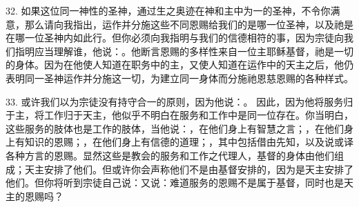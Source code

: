 32. 如果这位同一神性的圣神，通过生之奥迹在神和主中为一的圣神，不令你满意，那么请向我指出，运作并分施这些不同恩赐给我们的是哪一位圣神，以及祂是在哪一位圣神内如此行。但你必须向我指明与我们的信德相符的事，因为宗徒向我们指明应当理解谁，他说：。他断言恩赐的多样性来自一位主耶稣基督，祂是一切的身体。因为在他使人知道在职务中的主，又使人知道在运作中的天主之后，他仍表明同一圣神运作并分施这一切，为建立同一身体而分施祂恩慈恩赐的各种样式。\par

33. 或许我们以为宗徒没有持守合一的原则，因为他说：。 因此，因为他将服务归于主，将工作归于天主，他似乎不明白在服务和工作中是同一位存在。你当明白，这些服务的肢体也是工作的肢体，当他说：，在他们身上有智慧之言；，在他们身上有知识的恩赐；，在他们身上有信德的道理；，其中包括借由先知，以及说或译各种方言的恩赐。显然这些是教会的服务和工作之代理人，基督的身体由他们组成；天主安排了他们。但或许你会声称他们不是由基督安排的，因为是天主安排了他们。但你将听到宗徒自己说：又说：难道服务的恩赐不是属于基督，同时也是天主的恩赐吗？\par

